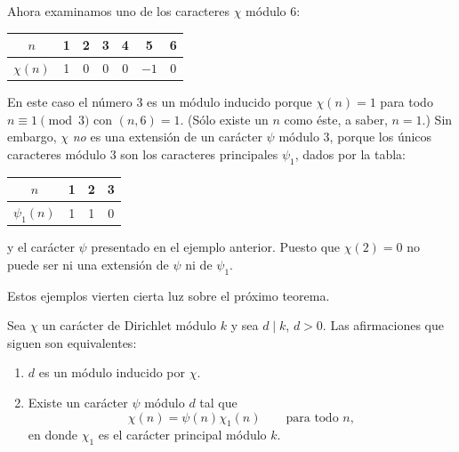 \documentclass[12pt,a4paper]{book}
\begin{document}
    \begin{ejemplo}
        Ahora examinamos uno de los caracteres $\chi$ módulo 6:
        \begin{center}
            \begin{tabular}{c|cccccc}
                $n$&1&2&3&4&5&6\\\hline
                $\chi(n)$&1&0&0&0&$-1$&0
            \end{tabular}
        \end{center}
        En este caso el número 3 es un módulo inducido porque $\chi(n)=1$ para todo
        $n\equiv1\pmod{3}$ con $(n,6)=1$. (Sólo existe un $n$ como éste, a saber, $n=1$.)
        Sin embargo, $\chi$ \textit{no} es una extensión de un carácter $\psi$ módulo 3,
        porque los únicos caracteres módulo 3 son los caracteres principales $\psi_{1}$, dados
        por la tabla:
        \begin{center}
            \begin{tabular}{c|ccc}
                $n$&1&2&3\\\hline
                $\psi_{1}(n)$&1&1&0
            \end{tabular}
        \end{center}
        y el carácter $\psi$ presentado en el ejemplo anterior. Puesto que $\chi(2)=0$ no
        puede ser ni una extensión de $\psi$ ni de $\psi_{1}$.
    \end{ejemplo}

    Estos ejemplos vierten cierta luz sobre el próximo teorema.

    \begin{teorema}
        Sea $\chi$ un carácter de Dirichlet módulo $k$ y sea $d\mid k$, $d>0$. Las
        afirmaciones que siguen son equivalentes:
        \begin{enumerate}
            \item[(a)] $d$ es un módulo inducido por $\chi$.
            \item[(b)] Existe un carácter $\psi$ módulo $d$ tal que
            \begin{equation}\label{eq:8-17}
                \chi(n)=\psi(n)\chi_{1}(n)\qquad\text{para todo }n,
            \end{equation}
            en donde $\chi_{1}$ es el carácter principal módulo $k$.
        \end{enumerate}
    \end{teorema}
\end{document}
